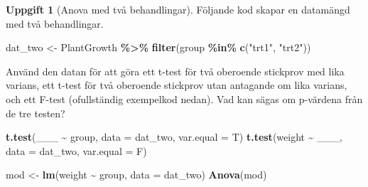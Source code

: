 \documentclass[
]{book}
\newenvironment{Shaded}{\begin{snugshade}}{\end{snugshade}}
\newcommand{\AttributeTok}[1]{\textcolor[rgb]{0.13,0.29,0.53}{#1}}
\newcommand{\FunctionTok}[1]{\textcolor[rgb]{0.13,0.29,0.53}{\textbf{#1}}}
\newcommand{\NormalTok}[1]{#1}
\newcommand{\OtherTok}[1]{\textcolor[rgb]{0.56,0.35,0.01}{#1}}
\newcommand{\SpecialCharTok}[1]{\textcolor[rgb]{0.81,0.36,0.00}{\textbf{#1}}}
\newcommand{\StringTok}[1]{\textcolor[rgb]{0.31,0.60,0.02}{#1}}
\theoremstyle{definition}
\theoremstyle{definition}
\theoremstyle{definition}
\newtheorem{exercise}{Uppgift}[chapter]
\theoremstyle{definition}
\theoremstyle{remark}
\begin{document}
\begin{exercise}[Anova med två behandlingar]

Följande kod skapar en datamängd med två behandlingar.

\begin{Shaded}
\begin{Highlighting}[]
\NormalTok{dat\_two }\OtherTok{\textless{}{-}}\NormalTok{ PlantGrowth }\SpecialCharTok{\%\textgreater{}\%} \FunctionTok{filter}\NormalTok{(group }\SpecialCharTok{\%in\%} \FunctionTok{c}\NormalTok{(}\StringTok{"trt1"}\NormalTok{, }\StringTok{"trt2"}\NormalTok{))}
\end{Highlighting}
\end{Shaded}

Använd den datan för att göra ett t-test för två oberoende stickprov med lika varians, ett t-test för två oberoende stickprov utan antagande om lika varians, och ett F-test (ofullständig exempelkod nedan). Vad kan sägas om p-värdena från de tre testen?

\begin{Shaded}
\begin{Highlighting}[]
\FunctionTok{t.test}\NormalTok{(\_\_\_ }\SpecialCharTok{\textasciitilde{}}\NormalTok{ group, }\AttributeTok{data =}\NormalTok{ dat\_two, }\AttributeTok{var.equal =}\NormalTok{ T)}
\FunctionTok{t.test}\NormalTok{(weight }\SpecialCharTok{\textasciitilde{}}\NormalTok{ \_\_\_, }\AttributeTok{data =}\NormalTok{ dat\_two, }\AttributeTok{var.equal =}\NormalTok{ F)}

\NormalTok{mod }\OtherTok{\textless{}{-}} \FunctionTok{lm}\NormalTok{(weight }\SpecialCharTok{\textasciitilde{}}\NormalTok{ group, }\AttributeTok{data =}\NormalTok{ dat\_two)}
\FunctionTok{Anova}\NormalTok{(mod)}
\end{Highlighting}
\end{Shaded}

\end{exercise}
\end{document}
